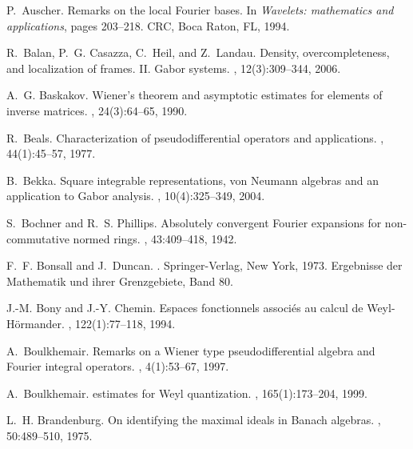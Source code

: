 \documentclass[12pt]{amsart}
\theoremstyle{definition}
\theoremstyle{remark}
\numberwithin{equation}{section}
\begin{document}
\def\cprime{$'$} \def\cprime{$'$}
\begin{thebibliography}{10}

P.~Auscher.
\newblock Remarks on the local {F}ourier bases.
\newblock In {\em Wavelets: mathematics and applications}, pages 203--218. CRC,
  Boca Raton, FL, 1994.

R.~Balan, P.~G. Casazza, C.~Heil, and Z.~Landau.
\newblock Density, overcompleteness, and localization of frames. {II}. {G}abor
  systems.
, 12(3):309--344, 2006.

A.~G. Baskakov.
\newblock Wiener's theorem and asymptotic estimates for elements of inverse
  matrices.
, 24(3):64--65, 1990.

R.~Beals.
\newblock Characterization of pseudodifferential operators and applications.
, 44(1):45--57, 1977.

B.~Bekka.
\newblock Square integrable representations, von {N}eumann algebras and an
  application to {G}abor analysis.
, 10(4):325--349, 2004.

S.~Bochner and R.~S. Phillips.
\newblock Absolutely convergent {F}ourier expansions for non-commutative normed
  rings.
, 43:409--418, 1942.

F.~F. Bonsall and J.~Duncan.
.
\newblock Springer-Verlag, New York, 1973.
\newblock Ergebnisse der Mathematik und ihrer Grenzgebiete, Band 80.

J.-M. Bony and J.-Y. Chemin.
\newblock Espaces fonctionnels associ\'es au calcul de {W}eyl-{H}\"ormander.
, 122(1):77--118, 1994.

A.~Boulkhemair.
\newblock Remarks on a {W}iener type pseudodifferential algebra and {F}ourier
  integral operators.
, 4(1):53--67, 1997.

A.~Boulkhemair.
 estimates for {W}eyl quantization.
, 165(1):173--204, 1999.

L.~H. Brandenburg.
\newblock On identifying the maximal ideals in {B}anach algebras.
, 50:489--510, 1975.


\end{thebibliography}
\end{document}
